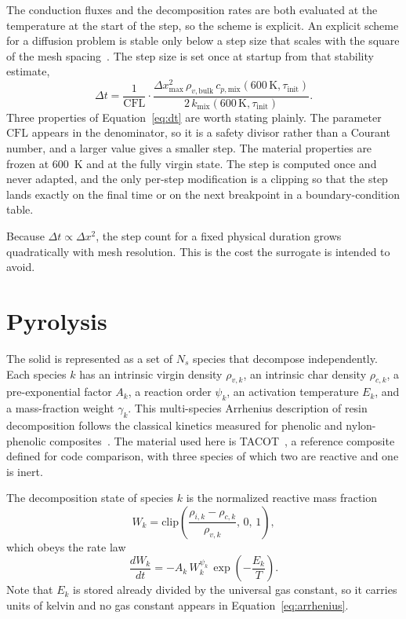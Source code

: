 \documentclass[11pt]{report}
\begin{document}
The conduction fluxes and the decomposition rates are both evaluated at the
temperature at the start of the step, so the scheme is explicit. An explicit
scheme for a diffusion problem is stable only below a step size that scales with
the square of the mesh spacing~\cite{morton2005pde}. The step size is
set once at startup from that stability estimate,
\begin{equation}
\Delta t = \frac{1}{\mathrm{CFL}} \cdot
\frac{\Delta x_{\max}^2\, \rho_{v,\mathrm{bulk}}\, c_{p,\mathrm{mix}}(600\,\mathrm{K}, \tau_{\mathrm{init}})}
{2\, k_{\mathrm{mix}}(600\,\mathrm{K}, \tau_{\mathrm{init}})} .
\label{eq:dt}
\end{equation}
Three properties of Equation~\eqref{eq:dt} are worth stating plainly. The
parameter $\mathrm{CFL}$ appears in the denominator, so it is a safety divisor
rather than a Courant number, and a larger value gives a smaller step. The
material properties are frozen at $600$~K and at the fully virgin state. The step
is computed once and never adapted, and the only per-step modification is a
clipping so that the step lands exactly on the final time or on the next
breakpoint in a boundary-condition table.

Because $\Delta t \propto \Delta x^2$, the step count for a fixed physical
duration grows quadratically with mesh resolution. This is the cost the surrogate
is intended to avoid.

\section{Pyrolysis}

The solid is represented as a set of $N_s$ species that decompose independently.
Each species $k$ has an intrinsic virgin density $\rho_{v,k}$, an intrinsic char
density $\rho_{c,k}$, a pre-exponential factor $A_k$, a reaction order $\psi_k$,
an activation temperature $E_k$, and a mass-fraction weight $\gamma_k$. This
multi-species Arrhenius description of resin decomposition follows the classical
kinetics measured for phenolic and nylon-phenolic
composites~\cite{goldstein1969kinetics}. The material used here is
TACOT~\cite{lachaud2012tacot}, a reference composite defined for code comparison,
with three species of which two are reactive and one is inert.

The decomposition state of species $k$ is the normalized reactive mass fraction
\begin{equation}
W_k = \mathrm{clip}\!\left(\frac{\rho_{i,k} - \rho_{c,k}}{\rho_{v,k}},\, 0,\, 1\right),
\end{equation}
which obeys the rate law
\begin{equation}
\frac{dW_k}{dt} = -A_k\, W_k^{\psi_k}\, \exp\!\left(-\frac{E_k}{T}\right).
\label{eq:arrhenius}
\end{equation}
Note that $E_k$ is stored already divided by the universal gas constant, so it
carries units of kelvin and no gas constant appears in
Equation~\eqref{eq:arrhenius}.
\end{document}
